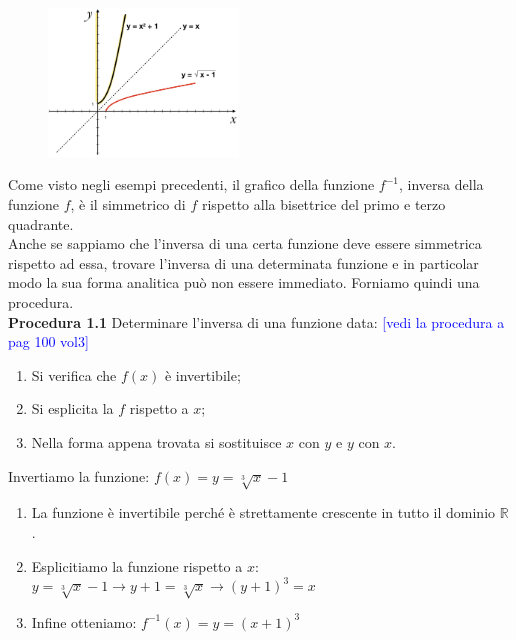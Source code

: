 \begin{esempio}
\begin{itemize}
\begin{figure}[htpb!]
  
  
\includegraphics[width=0.45\textwidth]{img/funz_14c.png} 
  \end{figure}
\end{itemize}
\end{esempio}

Come visto negli esempi precedenti, il grafico della funzione \(f^{-1}\), 
inversa della funzione \(f\), è il simmetrico di \(f\) rispetto alla bisettrice 
del primo e terzo quadrante.\\

Anche se sappiamo che l'inversa di una certa funzione deve essere simmetrica 
rispetto ad essa, trovare l'inversa di una determinata funzione e in 
particolar modo la sua forma analitica può non essere immediato. Forniamo 
quindi una procedura.\\

\textbf{Procedura 1.1} Determinare l'inversa di una funzione data:%
\textcolor{blue}{[vedi la procedura a pag 100 vol3]}
\begin{enumerate}
  \item Si verifica che \(f(x)\) è invertibile;
  \item Si esplicita la \(f\) rispetto a \(x\);
  \item Nella forma appena trovata si sostituisce \(x\) con \(y\) e \(y\) con 
\(x\).
\end{enumerate}
  
\begin{esempio}
Invertiamo la funzione: \(f(x)=y=\sqrt[3]{x}-1\)
\begin{enumerate}
  \item La funzione è invertibile perché è strettamente crescente in 
tutto il dominio \(\mathbb{R}\).
  \item Esplicitiamo la funzione rispetto a \(x\):\\
   \(y=\sqrt[3]{x}-1\rightarrow y+1=\sqrt[3]{x}\rightarrow(y+1)^3=x\)
  \item Infine otteniamo: \(f^{-1}(x)=y=(x+1)^3\)
\end{enumerate}
\end{esempio}

